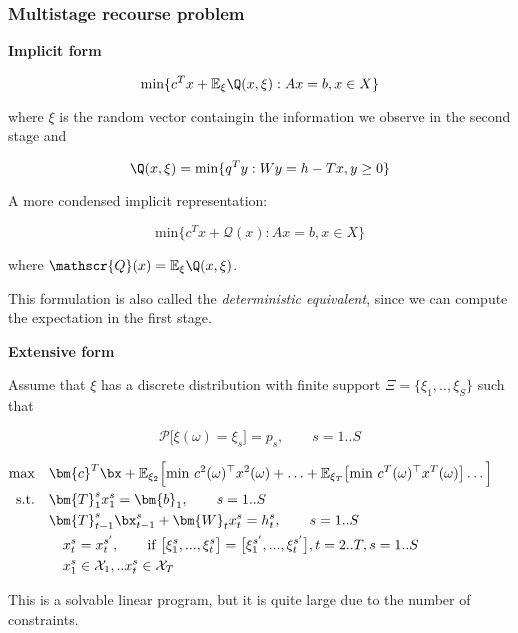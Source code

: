 \subsubsection{Multistage recourse problem}

\textbf{Implicit form}

\[
\text{min} \{ c^T x + \mathbb{E}_\xi \Q(x,\xi) : Ax=b, x\in X \}
\]

where $\xi$ is the random vector containgin the information we observe in the
second stage and

\[
\Q(x, \xi) = \text{min} \{ q^T y : Wy = h - Tx, y \geq 0 \}
\]

A more condensed implicit representation:

\[
\text{min} \{ c^T x + \mathscr{Q}(x) : Ax=b, x\in X \}
\]

where $\mathscr{Q}(x) = \mathbb{E}_\xi \Q(x,\xi)$.

This formulation is also called the \emph{deterministic equivalent}, since we
can compute the expectation in the first stage.

\textbf{Extensive form}

Assume that $\xi$ has a discrete distribution with finite support $\Xi = \{\xi_1, .., \xi_S\}$
such that

\[
\mathcal{P}\big[\xi(\omega) = \xi_s\big] = p_s,\quad \quad s=1..S
\]

\begin{alignat}{2}
\textrm{max} & \quad \bm{c}^T \bx + \mathbb{E}_{\xi_2}\Big[\text{min }c^2(\omega)^\top x^2(\omega) + \ldots + \mathbb{E}_{\xi_T}\big[
\text{min }c^T(\omega)^\top x^T(\omega) \big]\ldots\Big]& \ \\
\text{s.t.}  & \quad \bm{T}_1^s x_1^s = \bm{b}_1, \quad \quad s=1..S\ \\
             & \quad \bm{T}_{t-1}^s \bx_{t-1}^s + \bm{W}_t x_t^s = h_t^s, \quad \quad s=1..S\ \\
             & \quad \quad x_t^s = x_t^{s'}, \qquad \text{if } \big[ \xi_1^s, ..., \xi_t^s \big] = \big[ \xi_1^{s'}, ..., \xi_t^{s'} \big], t=2..T, s=1..S \ \label{eq:nonanti} \\
             & \quad \quad x_1^s \in \mathcal{X}_1, .. x_t^s \in \mathcal{X}_T & \ \\
\end{alignat}

This is a solvable linear program, but it is quite large due to the number of constraints.


